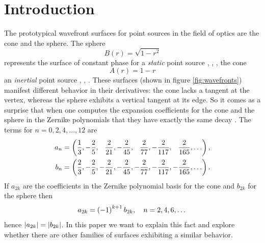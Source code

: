 \documentclass[preprint,12pt]{elsarticle}
\begin{document}

\section{Introduction}
\label{sec:introduction}
The prototypical wavefront surfaces for point sources in the field of optics are the cone and the sphere. The sphere 
  \begin{equation}
      B(r) = \sqrt{1-r^{2}}
    \label{eq:sphere}
  \end{equation}
represents the surface of constant phase for a \emph{static} point source \cite[\S1.3.2]{BW}, \cite[\S2.9]{Hecht}, \cite[p. 33]{do}, the cone 
  \begin{equation}
      A(r) = 1 - r
    \label{eq:cone}
  \end{equation}
an \emph{inertial} point source \cite[p. 146]{do}, \cite[p. 122]{Longair}, \cite[ch. 3]{Green}. These surfaces (shown in figure \ref{fig:wavefronts}) manifest different behavior in their derivatives: the cone lacks a tangent at the vertex, whereas the sphere exhibits a vertical tangent at its edge. So it comes as a surprise that when one computes the expansion coefficients for the cone and the sphere in the Zernike polynomials that they have exactly the same decay \cite{22358}. The terms for $n=0,2,4,\dots,12$ are
  \begin{equation}
    \begin{split}
      a_{n} &= \paren{ \frac{1}{3},-\frac{2}{5},\phantom{-}\frac{2}{21},-\frac{2}{45},\phantom{-}\frac{2}{77},-\frac{2}{117},\phantom{-}\frac{2}{165}, \dots }, \\
      b_{n} &= \paren{ \frac{2}{3},-\frac{2}{5},-\frac{2}{21},-\frac{2}{45},-\frac{2}{77},-\frac{2}{117},-\frac{2}{165}, \dots }. \\
    \end{split}
    \label{eqn:archeoamps}
  \end{equation}
If $a_{2k}$ are the coefficients in the Zernike polynomial basis for the cone and $b_{2k}$ for the sphere then
\begin{equation}
  a_{2k} = \left( -1 \right)^{k+1} b_{2k}, \quad n = 2, 4, 6, \dots
\end{equation}
hence $\left|a_{2k}\right| = \left|b_{2k}\right|$. In this paper we want to explain this fact and explore whether there are other families of surfaces exhibiting a similar behavior.
\end{document}
